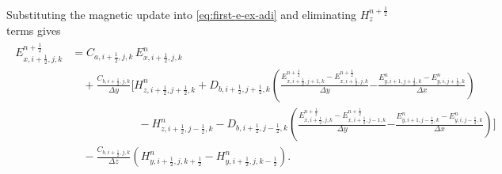 \documentclass{article}
\numberwithin{equation}{section}
\numberwithin{figure}{section}
\begin{document}
Substituting the magnetic update into \eqref{eq:first-e-ex-adi} and eliminating $H_{z}^{n+\frac12}$ terms gives
\begin{align}
    \begin{split}
        E_{x,i+\tfrac12,j,k}^{n+\frac12} & = C_{a,i+\tfrac12,j,k}\,E_{x,i+\tfrac12,j,k}^{n}                                                                                                                                                                                                                                                           \\
                                         & \quad + \frac{C_{b,i+\tfrac12,j,k}}{\Delta y}\Bigg[H_{z,i+\tfrac12,j+\tfrac12,k}^{n} + D_{b,i+\tfrac12,j+\tfrac12,k}\left(\frac{E_{x,i+\tfrac12,j+1,k}^{n+\frac12}-E_{x,i+\tfrac12,j,k}^{n+\frac12}}{\Delta y}\right. \left. - \frac{E_{y,i+1,j+\tfrac12,k}^{n}-E_{y,i,j+\tfrac12,k}^{n}}{\Delta x}\right) \\
                                         & \qquad\qquad\qquad - H_{z,i+\tfrac12,j-\tfrac12,k}^{n} - D_{b,i+\tfrac12,j-\tfrac12,k}\left(\frac{E_{x,i+\tfrac12,j,k}^{n+\frac12}-E_{x,i+\tfrac12,j-1,k}^{n+\frac12}}{\Delta y}\right. \left. - \frac{E_{y,i+1,j-\tfrac12,k}^{n}-E_{y,i,j-\tfrac12,k}^{n}}{\Delta x}\right)\Bigg]                         \\
                                         & \quad - \frac{C_{b,i+\tfrac12,j,k}}{\Delta z}\left(H_{y,i+\tfrac12,j,k+\tfrac12}^{n}-H_{y,i+\tfrac12,j,k-\tfrac12}^{n}\right).
    \end{split}
\end{align}
\end{document}
